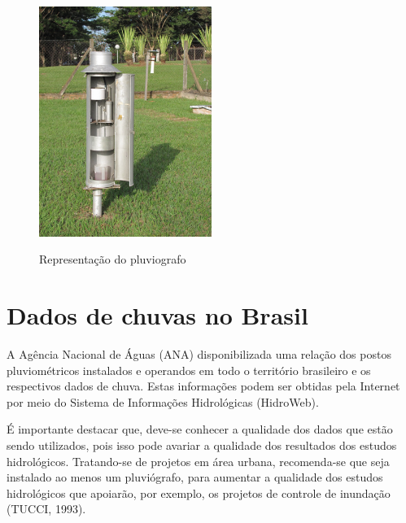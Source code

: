 \begin{figure}
    \caption{Representação do pluviografo}
    \centering
    \includegraphics[width=0.5\textwidth]{Textuais/Figuras/pluviografo.jpg}
    \label{fig:pluviografo}
\end{figure}

\section{Dados de chuvas no Brasil}

A Agência Nacional de Águas (ANA) disponibilizada uma relação dos postos pluviométricos instalados e operandos em todo o território brasileiro e os respectivos dados de chuva. Estas informações podem ser obtidas pela Internet por meio do Sistema de Informações Hidrológicas (HidroWeb). 

É importante destacar que, deve-se conhecer a qualidade dos dados que estão sendo utilizados, pois isso pode avariar a qualidade dos resultados dos estudos hidrológicos. Tratando-se de projetos em área urbana, recomenda-se que seja instalado ao menos um pluviógrafo, para aumentar a qualidade dos estudos hidrológicos que apoiarão, por exemplo, os projetos de controle de inundação (TUCCI, 1993).